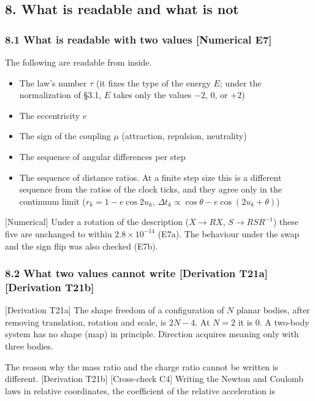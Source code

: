 \documentclass[
  a4paper,
]{article}
\providecommand{\tightlist}{%
  \setlength{\itemsep}{0pt}\setlength{\parskip}{0pt}}
\begin{document}
\subsection{8. What is readable and what is
not}\label{what-is-readable-and-what-is-not}

\subsubsection{8.1 What is readable with two values {[}Numerical
E7{]}}\label{what-is-readable-with-two-values-numerical-e7}

The following are readable from inside.

\begin{itemize}
\tightlist
\item
  The law's number \(\tau\) (it fixes the type of the energy \(E\);
  under the normalization of §3.1, \(E\) takes only the values \(-2\),
  \(0\), or \(+2\))
\item
  The eccentricity \(e\)
\item
  The sign of the coupling \(\mu\) (attraction, repulsion, neutrality)
\item
  The sequence of angular differences per step
\item
  The sequence of distance ratios. At a finite step size this is a
  different sequence from the ratios of the clock ticks, and they agree
  only in the continuum limit (\(r_k=1-e\cos2u_k\),
  \(\Delta t_k\propto\cos\theta-e\cos(2u_k+\theta)\))
\end{itemize}

{[}Numerical{]} Under a rotation of the description (\(X\to RX\),
\(S\to RSR^{-1}\)) these five are unchanged to within
\(2.8\times10^{-14}\) (E7a). The behaviour under the swap and the sign
flip was also checked (E7b).

\subsubsection{8.2 What two values cannot write {[}Derivation T21a{]}
{[}Derivation
T21b{]}}\label{what-two-values-cannot-write-derivation-t21a-derivation-t21b}

{[}Derivation T21a{]} The shape freedom of a configuration of \(N\)
planar bodies, after removing translation, rotation and scale, is
\(2N-4\). At \(N=2\) it is 0. A two-body system has no shape (map) in
principle. Direction acquires meaning only with three bodies.

The reason why the mass ratio and the charge ratio cannot be written is
different. {[}Derivation T21b{]} {[}Cross-check C4{]} Writing the Newton
and Coulomb laws in relative coordinates, the coefficient of the
relative acceleration is
\end{document}
